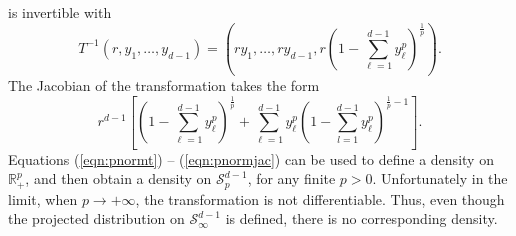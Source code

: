   is invertible with
  \begin{equation}
    \label{eqn:pnormtinv}
    T^{-1}\left(r,y_1,\ldots,y_{d-1}\right) =
      \left(ry_1,\ldots,ry_{d-1}, r\left(1 - {\textstyle\sum}_{\ell = 1}^{d-1}y_{\ell}^p\right)^{\frac{1}{p}}\right).
  \end{equation}
  The Jacobian of the transformation takes the form
  \begin{equation}
    \label{eqn:pnormjac}
    r^{d-1}\left[\left(1 - {\textstyle\sum}_{\ell = 1}^{d-1}y_{\ell}^p\right)^{\frac{1}{p}} +
        {\textstyle\sum}_{\ell = 1}^{d-1}y_{\ell}^p\left(1 - {\textstyle\sum}_{l=1}^{d-1} y_{\ell}^p\right)^{\frac{1}{p} - 1}\right].
  \end{equation}
  Equations (\ref{eqn:pnormt}) -- (\ref{eqn:pnormjac}) can be used to define a density on ${\mathbb R}^p_+$, and then obtain a density on $\mathcal{S}_{p}^{d-1}$, for any finite $p>0$. Unfortunately in the limit, when $p\rightarrow +\infty$, the transformation is not differentiable. Thus, even though the projected distribution on $\mathcal{S}_\infty^{d-1}$ is defined, there is no corresponding density.
  
